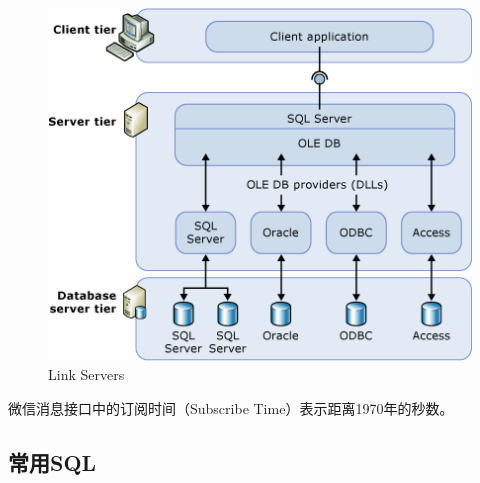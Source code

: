 \documentclass{book}
\begin{document}
\begin{figure}[htbp]
	\centering
	\includegraphics[scale=0.8]{LinkServerTier.bmp}
	\caption{Link Servers}
	\label{fig:LinkServerTier}
\end{figure}

微信消息接口中的订阅时间（Subscribe Time）表示距离1970年的秒数。

\subsection{常用SQL}
\end{document}
